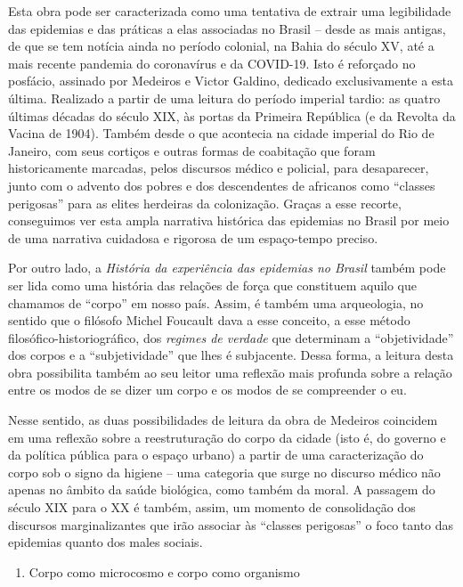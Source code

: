 Esta obra pode ser caracterizada como uma tentativa de extrair uma
legibilidade das epidemias e das práticas a elas associadas no Brasil --
desde as mais antigas, de que se tem notícia ainda no período colonial,
na Bahia do século XV, até a mais recente pandemia do coronavírus e da
COVID-19. Isto é reforçado no posfácio, assinado por Medeiros e Victor
Galdino, dedicado exclusivamente a esta última. Realizado a partir de
uma leitura do período imperial tardio: as quatro últimas décadas do
século XIX, às portas da Primeira República (e da Revolta da Vacina de
1904). Também desde o que acontecia na cidade imperial do Rio de
Janeiro, com seus cortiços e outras formas de coabitação que foram
historicamente marcadas, pelos discursos médico e policial, para
desaparecer, junto com o advento dos pobres e dos descendentes de
africanos como ``classes perigosas'' para as elites herdeiras da
colonização. Graças a esse recorte, conseguimos ver esta ampla narrativa
histórica das epidemias no Brasil por meio de uma narrativa cuidadosa e
rigorosa de um espaço-tempo preciso.

Por outro lado, a \emph{História da experiência das epidemias no Brasil}
também pode ser lida como uma história das relações de força que
constituem aquilo que chamamos de ``corpo'' em nosso país. Assim, é
também uma arqueologia, no sentido que o filósofo Michel Foucault dava a
esse conceito, a esse método filosófico-historiográfico, dos
\emph{regimes de verdade} que determinam a ``objetividade'' dos corpos e
a ``subjetividade'' que lhes é subjacente. Dessa forma, a leitura desta
obra possibilita também ao seu leitor uma reflexão mais profunda sobre a
relação entre os modos de se dizer um corpo e os modos de se compreender
o eu.

Nesse sentido, as duas possibilidades de leitura da obra de Medeiros
coincidem em uma reflexão sobre a reestruturação do corpo da cidade
(isto é, do governo e da política pública para o espaço urbano) a partir
de uma caracterização do corpo sob o signo da higiene -- uma categoria
que surge no discurso médico não apenas no âmbito da saúde biológica,
como também da moral. A passagem do século XIX para o XX é também,
assim, um momento de consolidação dos discursos marginalizantes que irão
associar às ``classes perigosas'' o foco tanto das epidemias quanto dos
males sociais.

\begin{enumerate}
\def\labelenumi{\arabic{enumi}.}
\setcounter{enumi}{5}
\tightlist
\item
  Corpo como microcosmo e corpo como organismo
\end{enumerate}

